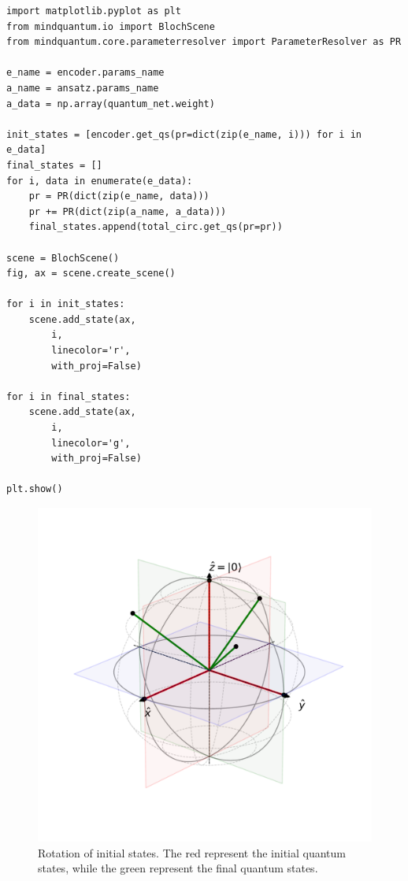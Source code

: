 \begin{lstlisting}
import matplotlib.pyplot as plt
from mindquantum.io import BlochScene
from mindquantum.core.parameterresolver import ParameterResolver as PR

e_name = encoder.params_name
a_name = ansatz.params_name
a_data = np.array(quantum_net.weight)

init_states = [encoder.get_qs(pr=dict(zip(e_name, i))) for i in e_data]
final_states = []
for i, data in enumerate(e_data):
    pr = PR(dict(zip(e_name, data)))
    pr += PR(dict(zip(a_name, a_data)))
    final_states.append(total_circ.get_qs(pr=pr))

scene = BlochScene()
fig, ax = scene.create_scene()

for i in init_states:
    scene.add_state(ax,
        i,
        linecolor='r',
        with_proj=False)

for i in final_states:
    scene.add_state(ax,
        i,
        linecolor='g',
        with_proj=False)

plt.show()
\end{lstlisting}

\begin{figure}[ht]
  \centering
  \includegraphics[scale=0.48]{./images/4_1_result.pdf}
  \caption{\label{4_1_vqa} Rotation of initial states. The red represent the initial quantum states, while the green represent the final quantum states.}
\end{figure}

